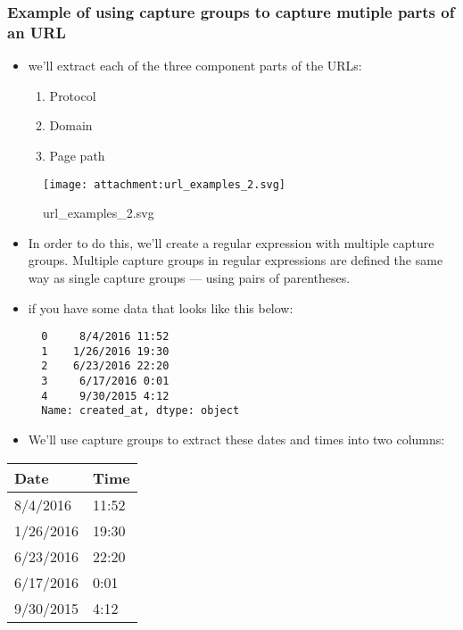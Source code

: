 \documentclass[11pt]{article}
\providecommand{\tightlist}{%
      \setlength{\itemsep}{0pt}\setlength{\parskip}{0pt}}
\begin{document}
\hypertarget{example-of-using-capture-groups-to-capture-mutiple-parts-of-an-url}{%
\subsubsection{Example of using capture groups to capture mutiple parts
of an
URL}\label{example-of-using-capture-groups-to-capture-mutiple-parts-of-an-url}}

\begin{itemize}
\item
  we'll extract each of the three component parts of the URLs:

  \begin{enumerate}
  \def\labelenumi{\arabic{enumi}.}
  \tightlist
  \item
    Protocol
  \item
    Domain
  \item
    Page path
  \end{enumerate}
\end{itemize}

\begin{figure}
\centering
\texttt{[image: attachment:url\_examples\_2.svg]}
\caption{url\_examples\_2.svg}
\end{figure}

\begin{itemize}
\item
  In order to do this, we'll create a regular expression with multiple
  capture groups. Multiple capture groups in regular expressions are
  defined the same way as single capture groups --- using pairs of
  parentheses.
\item
  if you have some data that looks like this below:

\begin{verbatim}
  0     8/4/2016 11:52
  1    1/26/2016 19:30
  2    6/23/2016 22:20
  3     6/17/2016 0:01
  4     9/30/2015 4:12
  Name: created_at, dtype: object
\end{verbatim}
\item
  We'll use capture groups to extract these dates and times into two
  columns:
\end{itemize}

\begin{longtable}[]{@{}ll@{}}
\toprule
Date & Time\tabularnewline
\midrule
\endhead
8/4/2016 & 11:52\tabularnewline
1/26/2016 & 19:30\tabularnewline
6/23/2016 & 22:20\tabularnewline
6/17/2016 & 0:01\tabularnewline
9/30/2015 & 4:12\tabularnewline
\bottomrule
\end{longtable}
\end{document}
